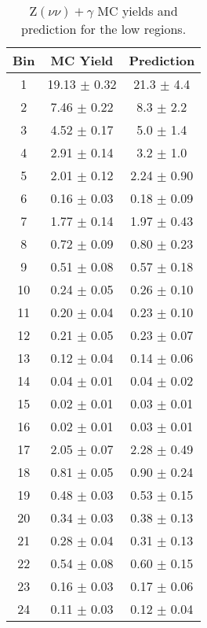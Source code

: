 \begin{table}[!htbp]
\centering
\captionsetup{width=.9\linewidth}
\caption[Z$(\nu\nu)+\gamma$ predictions in low \dphi]{Z$(\nu\nu)+\gamma$ MC yields and prediction for the low \dphi regions.}
\label{tab:znnLDPPredictions}
\begin{tabular}{c|c|c}
Bin  & MC Yield & Prediction \\ \hline\hline
1 & 19.13  $\pm$  0.32  & 21.3 $\pm$ 4.4    \\\hline
2 & 7.46  $\pm$  0.22  & 8.3 $\pm$ 2.2    \\\hline
3 & 4.52  $\pm$  0.17  & 5.0 $\pm$ 1.4    \\\hline
4 & 2.91  $\pm$  0.14  & 3.2 $\pm$ 1.0    \\\hline
5 & 2.01  $\pm$  0.12  & 2.24 $\pm$ 0.90    \\\hline
6 & 0.16  $\pm$  0.03  & 0.18 $\pm$ 0.09    \\\hline
7 & 1.77  $\pm$  0.14  & 1.97 $\pm$ 0.43    \\\hline
8 & 0.72  $\pm$  0.09  & 0.80 $\pm$ 0.23    \\\hline
9 & 0.51  $\pm$  0.08  & 0.57 $\pm$ 0.18    \\\hline
10 & 0.24  $\pm$  0.05  & 0.26 $\pm$ 0.10    \\\hline
11 & 0.20  $\pm$  0.04  & 0.23 $\pm$ 0.10    \\\hline
12 & 0.21  $\pm$  0.05  & 0.23 $\pm$ 0.07    \\\hline
13 & 0.12  $\pm$  0.04  & 0.14 $\pm$ 0.06    \\\hline
14 & 0.04  $\pm$  0.01  & 0.04 $\pm$ 0.02    \\\hline
15 & 0.02  $\pm$  0.01  & 0.03 $\pm$ 0.01    \\\hline
16 & 0.02  $\pm$  0.01  & 0.03 $\pm$ 0.01    \\\hline
17 & 2.05  $\pm$  0.07  & 2.28 $\pm$ 0.49    \\\hline
18 & 0.81  $\pm$  0.05  & 0.90 $\pm$ 0.24    \\\hline
19 & 0.48  $\pm$  0.03  & 0.53 $\pm$ 0.15    \\\hline
20 & 0.34  $\pm$  0.03  & 0.38 $\pm$ 0.13    \\\hline
21 & 0.28  $\pm$  0.04  & 0.31 $\pm$ 0.13    \\\hline
22 & 0.54  $\pm$  0.08  & 0.60 $\pm$ 0.15    \\\hline
23 & 0.16  $\pm$  0.03  & 0.17 $\pm$ 0.06    \\\hline
24 & 0.11  $\pm$  0.03  & 0.12 $\pm$ 0.04    \\\hline

\end{tabular}
\end{table}
